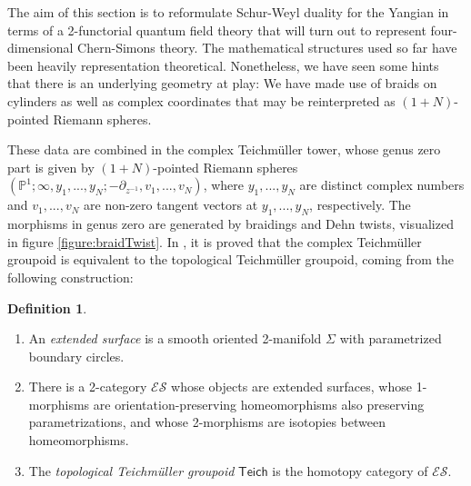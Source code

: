 \documentclass[11pt]{report}
\theoremstyle{definition}
\newtheorem{definition}[theorem]{Definition}
\theoremstyle{remark}
\theoremstyle{remark}
\renewcommand{\P}{\mathbb{P}}
\begin{document}
The aim of this section is to reformulate Schur-Weyl duality for the Yangian in terms of a 2-functorial quantum field theory that will turn out to represent four-dimensional Chern-Simons theory. The mathematical structures used so far have been heavily representation theoretical. Nonetheless, we have seen some hints that there is an underlying geometry at play: We have made use of braids on cylinders as well as complex coordinates that may be reinterpreted as $(1+N)$-pointed Riemann spheres. 

These data are combined in the complex Teichmüller tower, whose genus zero part is given by $(1+N)$-pointed Riemann spheres $(\P^1;\infty,y_1,...,y_N;-\partial_{z^{-1}},v_1,...,v_N)$, where $y_1,...,y_N$ are distinct complex numbers and $v_1,...,v_N$ are non-zero tangent vectors at $y_1,...,y_N$, respectively. The morphisms in genus zero are generated by braidings and Dehn twists, visualized in figure \ref{figure:braidTwist}. In \cite{book:bakalov}, it is proved that the complex Teichmüller groupoid is equivalent to the topological Teichmüller groupoid, coming from the following construction:

\begin{definition}
\begin{enumerate}[label=(\roman*)]
\item An \emph{extended surface} is a smooth oriented 2-manifold $\Sigma$ with parametrized boundary circles.
\item There is a 2-category $\mathcal{ES}$ whose objects are extended surfaces, whose 1-morphisms are orientation-preserving homeomorphisms also preserving parametrizations, and whose 2-morphisms are isotopies between homeomorphisms.
\item The \emph{topological Teichmüller groupoid} $\mathsf{Teich}$ is the homotopy category of $\mathcal{ES}$.
\end{enumerate}
\end{definition}
\end{document}
